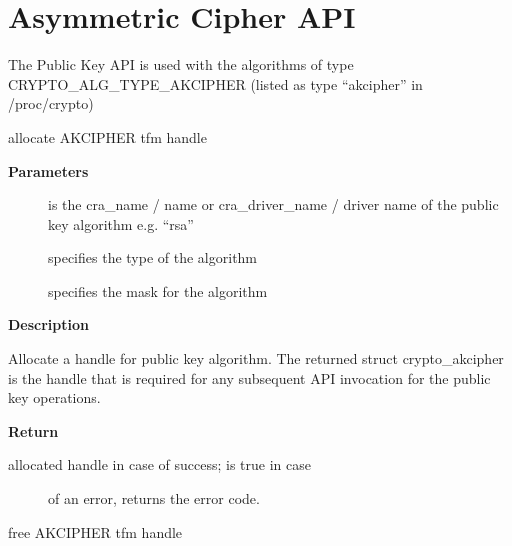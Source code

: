 \documentclass[a4paper,8pt,english]{sphinxmanual}
\begin{document}
\section{Asymmetric Cipher API}
\label{crypto/api-akcipher:asymmetric-cipher-api}
The Public Key API is used with the algorithms of type
CRYPTO\_ALG\_TYPE\_AKCIPHER (listed as type ``akcipher'' in /proc/crypto)

\begin{fulllineitems}
\label{crypto/api-akcipher:c.crypto_alloc_akcipher}
allocate AKCIPHER tfm handle

\end{fulllineitems}


\textbf{Parameters}
\begin{description}
\item[{}] \leavevmode
is the cra\_name / name or cra\_driver\_name / driver name of the
public key algorithm e.g. ``rsa''

\item[{}] \leavevmode
specifies the type of the algorithm

\item[{}] \leavevmode
specifies the mask for the algorithm

\end{description}

\textbf{Description}

Allocate a handle for public key algorithm. The returned struct
crypto\_akcipher is the handle that is required for any subsequent
API invocation for the public key operations.

\textbf{Return}
\begin{description}
\item[{allocated handle in case of success;  is true in case}] \leavevmode
of an error,  returns the error code.

\end{description}

\begin{fulllineitems}
\label{crypto/api-akcipher:c.crypto_free_akcipher}
free AKCIPHER tfm handle

\end{fulllineitems}
\end{document}
